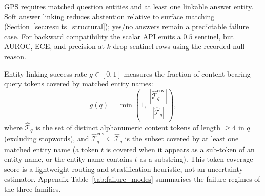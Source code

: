 GPS requires matched question entities and at least one linkable answer entity.
Soft answer linking reduces abstention relative to surface matching
(Section~\ref{sec:results_structural}); yes/no answers remain a predictable
failure case.
For backward compatibility the scalar API emits a $0.5$ sentinel, but AUROC,
ECE, and precision-at-$k$ drop sentinel rows using the recorded null reason.

Entity-linking success rate $g \in [0, 1]$ measures
the fraction of content-bearing query tokens covered by matched entity names:
\begin{equation}
  g(q) = \min\!\left(1,\; \frac{|\hat{\mathcal{T}}_q^{\mathrm{cov}}|}{|\hat{\mathcal{T}}_q|}\right),
\end{equation}
where $\hat{\mathcal{T}}_q$ is the set of distinct alphanumeric content tokens
of length $\geq 4$ in $q$ (excluding stopwords), and
$\hat{\mathcal{T}}_q^{\mathrm{cov}} \subseteq \hat{\mathcal{T}}_q$ is the
subset covered by at least one matched entity name (a token $t$ is covered
when it appears as a sub-token of an entity name, or the entity name contains
$t$ as a substring).
This token-coverage score is a lightweight routing and stratification
heuristic, not an uncertainty estimator.
Appendix Table~\ref{tab:failure_modes} summarises the failure regimes of the
three families.
